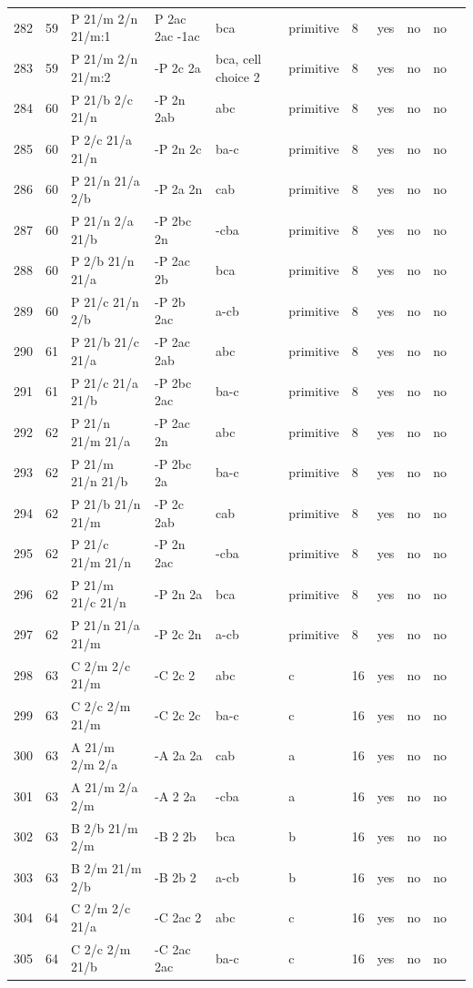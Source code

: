 \begin{center}
\begin{small}
\begin{longtable}{|l|l|l|l|l|l|l|l|l|l|l|}
282 &59 &P 21/m 2/n 21/m:1 &P 2ac 2ac -1ac &bca &primitive &8 &yes &no &no \\ 
283 &59 &P 21/m 2/n 21/m:2 &-P 2c 2a &bca, cell choice 2 &primitive &8 &yes &no &no \\ 
284 &60 &P 21/b 2/c 21/n &-P 2n 2ab &abc &primitive &8 &yes &no &no \\ 
285 &60 &P 2/c 21/a 21/n &-P 2n 2c &ba-c &primitive &8 &yes &no &no \\ 
286 &60 &P 21/n 21/a 2/b &-P 2a 2n &cab &primitive &8 &yes &no &no \\ 
287 &60 &P 21/n 2/a 21/b &-P 2bc 2n &-cba &primitive &8 &yes &no &no \\ 
288 &60 &P 2/b 21/n 21/a &-P 2ac 2b &bca &primitive &8 &yes &no &no \\ 
289 &60 &P 21/c 21/n 2/b &-P 2b 2ac &a-cb &primitive &8 &yes &no &no \\ 
290 &61 &P 21/b 21/c 21/a &-P 2ac 2ab &abc &primitive &8 &yes &no &no \\ 
291 &61 &P 21/c 21/a 21/b &-P 2bc 2ac &ba-c &primitive &8 &yes &no &no \\ 
292 &62 &P 21/n 21/m 21/a &-P 2ac 2n &abc &primitive &8 &yes &no &no \\ 
293 &62 &P 21/m 21/n 21/b &-P 2bc 2a &ba-c &primitive &8 &yes &no &no \\ 
294 &62 &P 21/b 21/n 21/m &-P 2c 2ab &cab &primitive &8 &yes &no &no \\ 
295 &62 &P 21/c 21/m 21/n &-P 2n 2ac &-cba &primitive &8 &yes &no &no \\ 
296 &62 &P 21/m 21/c 21/n &-P 2n 2a &bca &primitive &8 &yes &no &no \\ 
297 &62 &P 21/n 21/a 21/m &-P 2c 2n &a-cb &primitive &8 &yes &no &no \\ 
298 &63 &C 2/m 2/c 21/m &-C 2c 2 &abc &c &16 &yes &no &no \\ 
299 &63 &C 2/c 2/m 21/m &-C 2c 2c &ba-c &c &16 &yes &no &no \\ 
300 &63 &A 21/m 2/m 2/a &-A 2a 2a &cab &a &16 &yes &no &no \\ 
301 &63 &A 21/m 2/a 2/m &-A 2 2a &-cba &a &16 &yes &no &no \\ 
302 &63 &B 2/b 21/m 2/m &-B 2 2b &bca &b &16 &yes &no &no \\ 
303 &63 &B 2/m 21/m 2/b &-B 2b 2 &a-cb &b &16 &yes &no &no \\ 
304 &64 &C 2/m 2/c 21/a &-C 2ac 2 &abc &c &16 &yes &no &no \\ 
305 &64 &C 2/c 2/m 21/b &-C 2ac 2ac &ba-c &c &16 &yes &no &no \\ 

\end{longtable}
\end{small}
\end{center}
